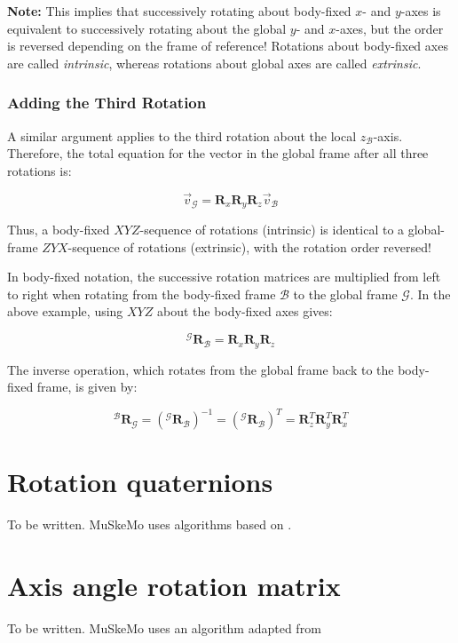 \documentclass{article}
\begin{document}
\textbf{Note:} This implies that successively rotating about body-fixed \( x \)- and \( y \)-axes is equivalent to successively rotating about the global \( y \)- and \( x \)-axes, but the order is reversed depending on the frame of reference! Rotations about body-fixed axes are called \emph{intrinsic}, whereas rotations about global axes are called \emph{extrinsic}.

\subsubsection*{Adding the Third Rotation}

A similar argument applies to the third rotation about the local \( z_{\mathcal{B}} \)-axis. Therefore, the total equation for the vector in the global frame after all three rotations is:

\[
\vec{v}_{\mathcal{G}} = \mathbf{R}_x \mathbf{R}_y \mathbf{R}_z \vec{v}_{\mathcal{B}}
\]

Thus, a body-fixed \( XYZ \)-sequence of rotations (intrinsic) is identical to a global-frame \( ZYX \)-sequence of rotations (extrinsic), with the rotation order reversed!

In body-fixed notation, the successive rotation matrices are multiplied from left to right when rotating from the body-fixed frame \( \mathcal{B} \) to the global frame \( \mathcal{G} \). In the above example, using \( XYZ \) about the body-fixed axes gives:

\[
{}^{\mathcal{G}} \mathbf{R}_{\mathcal{B}} = \mathbf{R}_x \mathbf{R}_y \mathbf{R}_z
\]

The inverse operation, which rotates from the global frame back to the body-fixed frame, is given by:

\[
{}^{\mathcal{B}} \mathbf{R}_{\mathcal{G}} = ({}^{\mathcal{G}} \mathbf{R}_{\mathcal{B}})^{-1} = ({}^{\mathcal{G}} \mathbf{R}_{\mathcal{B}})^{T} = \mathbf{R}_z^T \mathbf{R}_y^T \mathbf{R}_x^T
\]



\section{Rotation quaternions}
\label{sec:quaternions}

To be written. MuSkeMo uses algorithms based on \cite{eberlyGamePhysics2004}.

\section{Axis angle rotation matrix}
\label{sec:axisanglerotation}
To be written. MuSkeMo uses an algorithm adapted from \cite{valleryAdvancedDynamics2019}
\end{document}

